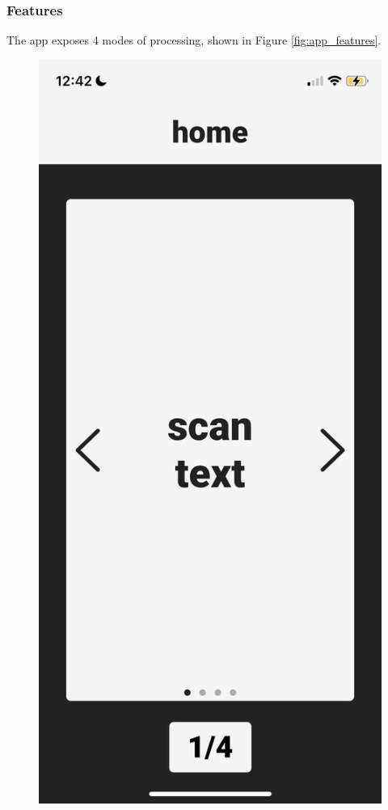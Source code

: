 \documentclass[a4paper,11pt]{article}
\begin{document}
\subsubsection{Features}
The app exposes 4 modes of processing, shown in Figure \ref{fig:app_features}.
\begin{figure}[H]
\centering
\includegraphics[scale=0.1]{img/app/landing1.png}

\end{figure}
\end{document}

